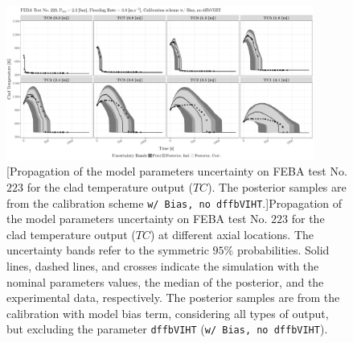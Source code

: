 \clearpage
\begin{figure}
	\centering
	\includegraphics[width=0.90\textwidth]{../figures/chapter5/figures/plotTraceUQPosteriorAllDiscCenteredNoParam8TC223}
		[Propagation of the model parameters uncertainty on FEBA test No. $223$ for the clad temperature output ($TC$). The posterior samples are from the calibration scheme \texttt{w/ Bias, no dffbVIHT}.]{Propagation of the model parameters uncertainty on FEBA test No. $223$ for the clad temperature output ($TC$) at different axial locations. The uncertainty bands refer to the symmetric $95\%$ probabilities. Solid lines, dashed lines, and crosses indicate the simulation with the nominal parameters values, the median of the posterior, and the experimental data, respectively. The posterior samples are from the calibration with model bias term, considering all types of output, but excluding the parameter \texttt{dffbVIHT} (\texttt{w/ Bias, no dffbVIHT}).}
	\label{fig:ch5_plot_trace_uq_post_tc_223_noparam8}
\end{figure}
\clearpage

